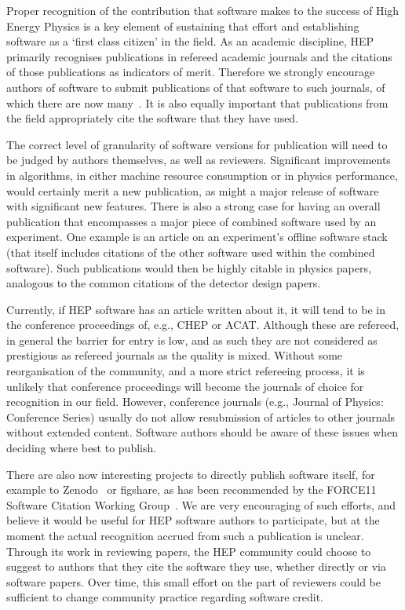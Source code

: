 \documentclass[12pt,a4paper]{article}
\begin{document}
Proper recognition of the contribution that software makes to the
success of High Energy Physics is a key element of sustaining that
effort and establishing software as a `first class citizen' in the
field. As an academic discipline, HEP primarily recognises publications
in refereed academic journals and the citations of those publications as
indicators of merit. Therefore we strongly encourage authors of software
to submit publications of that software to such journals, of which there
are now many~\cite{SSI2017}.
It is also equally important that publications from the field
appropriately cite the software that they have used.

The correct level of granularity of software versions for publication
will need to be judged by authors themselves, as well as reviewers.
Significant improvements in algorithms, in either machine resource
consumption or in physics performance, would certainly merit a new
publication, as might a major release of software with significant new
features. There is also a strong case for having an overall publication
that encompasses a major piece of combined software used by an
experiment. One example is an article on an experiment's offline
software stack (that itself includes citations of the other software
used within the combined software). Such publications would then be
highly citable in physics papers, analogous to the common citations of
the detector design papers.

Currently, if HEP software has an article written about it, it will tend
to be in the conference proceedings of, e.g., CHEP or ACAT. Although
these are refereed, in general the barrier for entry is low, and as such
they are not considered as prestigious as refereed journals as the
quality is mixed. Without some reorganisation of the community, and a
more strict refereeing process, it is unlikely that conference
proceedings will become the journals of choice for recognition in our
field. However, conference journals (e.g., Journal of Physics:
Conference Series) usually do not allow resubmission of articles to
other journals without extended content. Software authors should be
aware of these issues when deciding where best to publish.

There are also now interesting projects to directly publish software
itself, for example to Zenodo~\cite{Zenodo} or
figshare\cite{figshare}, as has been recommended by the
FORCE11
Software Citation Working Group~\cite{10.7717/peerj-cs.86}. We are very
encouraging of such efforts, and believe it would be useful for HEP
software authors to participate, but at the moment the actual
recognition accrued from such a publication is unclear. Through its work
in reviewing papers, the HEP community could choose to suggest to
authors that they cite the software they use, whether directly or via
software papers. Over time, this small effort on the part of reviewers
could be sufficient to change community practice regarding software
credit.
\end{document}
